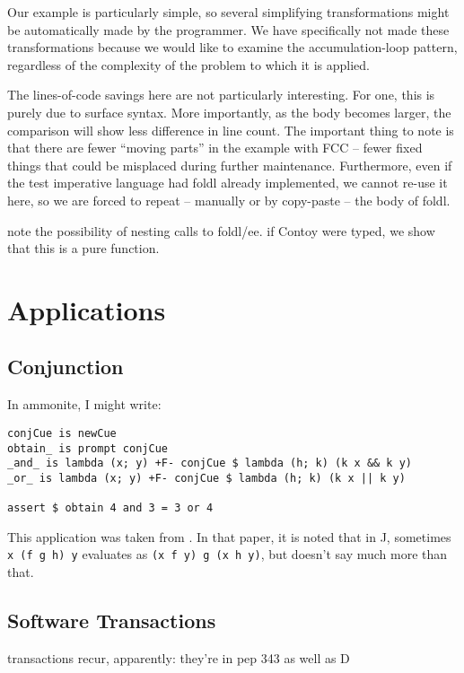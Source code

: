 \documentclass[11pt]{article}
\begin{document}
Our example is particularly simple, so several simplifying transformations might be automatically made by the programmer.
We have specifically not made these transformations because we would like to examine the accumulation-loop pattern, regardless of the complexity of the problem to which it is applied.

The lines-of-code savings here are not particularly interesting.
For one, this is purely due to surface syntax.
More importantly, as the body becomes larger, the comparison will show less difference in line count.
The important thing to note is that there are fewer ``moving parts'' in the example with FCC -- fewer fixed things that could be misplaced during further maintenance.
Furthermore, even if the test imperative language had foldl already implemented, we cannot re-use it here, so we are forced to repeat -- manually or by copy-paste -- the body of foldl.

note the possibility of nesting calls to foldl/ee.
if Contoy were typed, we show that this is a pure function.

\section{Applications}
\label{application}

\subsection{Conjunction}

In ammonite, I might write:

\begin{verbatim}
conjCue is newCue
obtain_ is prompt conjCue
_and_ is lambda (x; y) +F- conjCue $ lambda (h; k) (k x && k y)
_or_ is lambda (x; y) +F- conjCue $ lambda (h; k) (k x || k y)

assert $ obtain 4 and 3 = 3 or 4
\end{verbatim}

This application was taken from \cite{ContInNatlang}. In that paper, it is noted that in J, sometimes \texttt{x (f g h) y} evaluates as \texttt{(x f y) g (x h y)}, but doesn't say much more than that.



\subsection{Software Transactions}

transactions recur, apparently: they're in pep 343 as well as D
\end{document}
